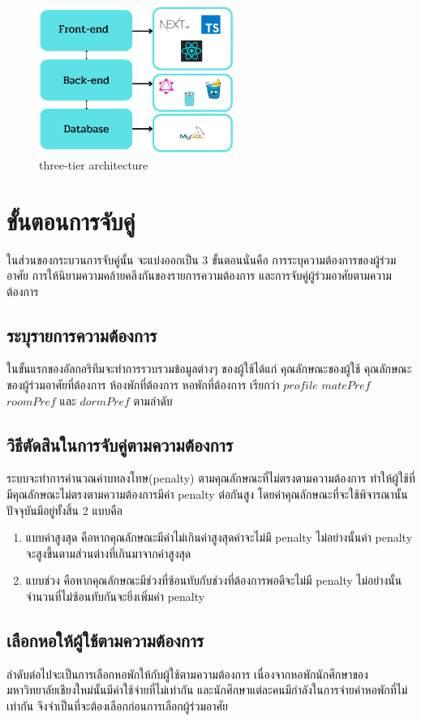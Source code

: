 \begin{figure}[h]
  \begin{center}
    \includegraphics[width=2.5in]{photo.old/threetierarch.png}
  \end{center}
  \caption{three-tier architecture}
  \label{fig:three-tier}
\end{figure}

\section{ขั้นตอนการจับคู่}
ในส่วนของกระบวนการจับคู่นั้น จะแบ่งออกเป็น 3 ขั้นตอนนั่นคือ การระบุความต้องการของผู้ร่วมอาศัย การให้นิยามความคล้ายคลึงกันของรายการความต้องการ
และการจับคู่ผู้ร่วมอาศัยตามความต้องการ
\subsection{ระบุรายการความต้องการ}
ในขั้นแรกของอัลกอริทึมจะทำการรวบรวมข้อมูลต่างๆ ของผู้ใช้ได้แก่ 
คุณลักษณะของผู้ใช้ คุณลักษณะของผู้ร่วมอาศัยที่ต้องการ ห้องพักที่ต้องการ หอพักที่ต้องการ เรียกว่า $profile$ $matePref$ $roomPref$
และ $dormPref$ ตามลำดับ
\subsection{วิธีตัดสินในการจับคู่ตามความต้องการ}
ระบบจะทำการคำนวณค่าบทลงโทษ(penalty) ตามคุณลักษณะที่ไม่ตรงตามความต้องการ ทำให้ผู้ใช้ที่มีคุณลักษณะไม่ตรงตามความต้องการมีค่า penalty ต่อกันสูง
โดยค่าคุณลักษณะที่จะใช้พิจารณานั้นปัจจุบันมีอยู่ทั้งสิ้น 2 แบบคือ
\begin{enumerate}
  \item แบบค่าสูงสุด คือหากคุณลักษณะมีค่าไม่เกินค่าสูงสุดค่าจะไม่มี penalty ไม่อย่างนั้นค่า penalty จะสูงขึ้นตามส่วนต่างที่เกินมาจากค่าสูงสุด
  \item แบบช่วง คือหากคุณลักษณะมีช่วงที่ซ้อนทับกับช่วงที่ต้องการพอดีจะไม่มี penalty ไม่อย่างนั้นจำนวนที่ไม่ซ้อนทับกันจะยิ่งเพิ่มค่า penalty
\end{enumerate}
\subsection{เลือกหอให้ผู้ใช้ตามความต้องการ}
ลำดับต่อไปจะเป็นการเลือกหอพักให้กับผู้ใช้ตามความต้องการ เนื่องจากหอพักนักศึกษาของมหาวิทยาลัยเชียงใหม่นั้นมีค่าใช้จ่ายที่ไม่เท่ากัน
และนักศึกษาแต่ละคนมีกำลังในการจ่ายค่าหอพักที่ไม่เท่ากัน จึงจำเป็นที่จะต้องเลือกก่อนการเลือกผู้ร่วมอาศัย 

